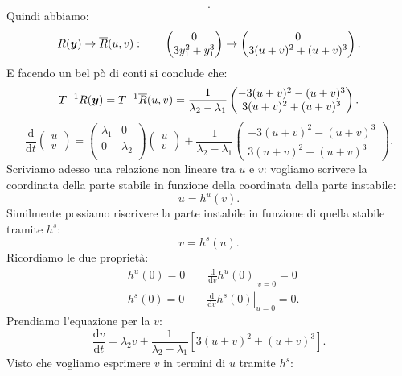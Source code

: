 \begin{exmp}
\[    .\] 
    Quindi abbiamo:
    \[
	R(\boldsymbol{y}) \to \overline{R}(u, v): \qquad  \begin{pmatrix} 0 \\ 3y_1^2 + y_1^3 \end{pmatrix}\to 
	\begin{pmatrix} 0 \\ 3(u + v) ^2 + (u + v) ^3 \end{pmatrix}
    .\] 
    E facendo un bel pò di conti si conclude che:
    \[
	T^{-1}R(\boldsymbol{y}) = 
	T^{-1}\overline{R}(u, v) = 
	\frac{1}{\lambda_2-\lambda_1}
	\begin{pmatrix} -3(u + v) ^2 - (u + v)^3 \\ 3(u + v)^2 + (u + v)^3 \end{pmatrix}
    .\] 
    \[
        \frac{\text{d} }{\text{d} t} \begin{pmatrix} u \\ v \end{pmatrix}=
    \begin{pmatrix}
	\lambda_1 & 0 \\
	0  & \lambda_2 \\
    \end{pmatrix}
    \begin{pmatrix} u \\ v \end{pmatrix} + 
    \frac{1}{\lambda_2-\lambda_1}
	\begin{pmatrix} -3(u + v) ^2 - (u + v)^3 \\ 3(u + v)^2 + (u + v)^3 \end{pmatrix}
    .\] 
    Scriviamo adesso una relazione non lineare tra $u$ e $v$: vogliamo scrivere la coordinata della parte stabile in funzione della coordinata della parte instabile:
    \[
	u = h^u(v) 
    .\] 
    Similmente possiamo riscrivere la parte instabile in funzione di quella stabile tramite $h^s$:
    \[
	v = h^s(u) 
    .\] 
    Ricordiamo le due proprietà:
    \[\begin{aligned}
	&h^u(0) = 0 \qquad  \left.\frac{\text{d} }{\text{d} v} h^u(0)\right|_{v=0} = 0\\
	&h^s(0) = 0 \qquad  \left.\frac{\text{d} }{\text{d} v} h^s(0)\right|_{u=0} = 0
    .\end{aligned}\]
    Prendiamo l'equazione per la $v$:
    \[
	\frac{\text{d} v}{\text{d} t} = \lambda_2v + \frac{1}{\lambda_2-\lambda_1} \left[3(u+v)^2 + (u + v)^3\right]
    .\] 
    Visto che vogliamo esprimere $v$ in termini di $u$ tramite $h^s$:

\end{exmp}

